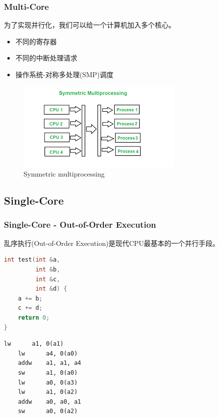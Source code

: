 \documentclass[aspectratio=169]{ctexbeamer}
\begin{document}
\begin{frame}
    \frametitle{Multi-Core}

    为了实现并行化，我们可以给一个计算机加入多个核心。

    \begin{itemize}
        \item 不同的寄存器
        \item 不同的中断处理请求
        \item 操作系统-对称多处理(SMP)调度
    \end{itemize}

    \begin{figure}[h]
        \includegraphics[height=0.45\textheight]{images/smp.png}
        \caption{Symmetric multiprocessing}
    \end{figure}

\end{frame}

\subsection{Single-Core}

\begin{frame}[fragile]
    \frametitle{Single-Core - Out-of-Order Execution}

    乱序执行(Out-of-Order Execution)是现代CPU最基本的一个并行手段。
    \begin{minipage}[t]{0.45\linewidth}
        \begin{lstlisting}[language=C++]
int test(int &a,
         int &b,
         int &c,
         int &d) {
    a += b;
    c += d;
    return 0;
}
        \end{lstlisting}
    \end{minipage}
    \begin{minipage}[t]{0.45\linewidth}
        \begin{lstlisting}[language={[RISC-V]Assembler}]
    lw      a1, 0(a1)
    lw      a4, 0(a0)
    addw    a1, a1, a4
    sw      a1, 0(a0)
    lw      a0, 0(a3)
    lw      a1, 0(a2)
    addw    a0, a0, a1
    sw      a0, 0(a2)
        \end{lstlisting}
    \end{minipage}


\end{frame}
\end{document}
